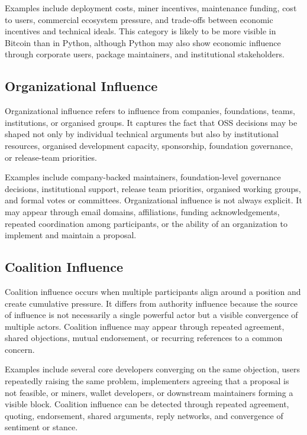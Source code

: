 \documentclass[sigconf,screen]{acmart}
\begin{document}
Examples include deployment costs, miner incentives, maintenance funding, cost to users, commercial ecosystem pressure, and trade-offs between economic incentives and technical ideals. This category is likely to be more visible in Bitcoin than in Python, although Python may also show economic influence through corporate users, package maintainers, and institutional stakeholders.

\subsection{Organizational Influence}

Organizational influence refers to influence from companies, foundations, teams, institutions, or organised groups. It captures the fact that OSS decisions may be shaped not only by individual technical arguments but also by institutional resources, organised development capacity, sponsorship, foundation governance, or release-team priorities.

Examples include company-backed maintainers, foundation-level governance decisions, institutional support, release team priorities, organised working groups, and formal votes or committees. Organizational influence is not always explicit. It may appear through email domains, affiliations, funding acknowledgements, repeated coordination among participants, or the ability of an organization to implement and maintain a proposal.

\subsection{Coalition Influence}

Coalition influence occurs when multiple participants align around a position and create cumulative pressure. It differs from authority influence because the source of influence is not necessarily a single powerful actor but a visible convergence of multiple actors. Coalition influence may appear through repeated agreement, shared objections, mutual endorsement, or recurring references to a common concern.

Examples include several core developers converging on the same objection, users repeatedly raising the same problem, implementers agreeing that a proposal is not feasible, or miners, wallet developers, or downstream maintainers forming a visible block. Coalition influence can be detected through repeated agreement, quoting, endorsement, shared arguments, reply networks, and convergence of sentiment or stance.
\end{document}
